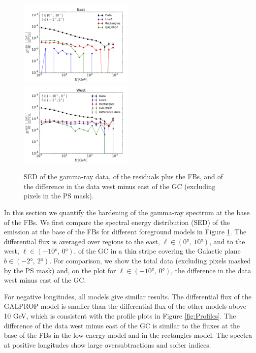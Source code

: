 \begin{figure}[h]
\includegraphics[width=0.5\textwidth]{plots/SED_all_models_source_l=5_b=0.pdf}
\includegraphics[width=0.5\textwidth]{plots/SED_all_models_source_l=-5_b=0.pdf}
  	\caption{SED of the gamma-ray data, of the residuals plus the FBs, and of the difference in the data west minus east of the GC (excluding pixels in the PS mask). 
	}
  	\label{fig:SED_all}
\end{figure}

In this section we quantify the hardening of the gamma-ray spectrum at the base of the FBs. 
We first compare the spectral energy distribution (SED) of the emission at the base of the FBs for different foreground models in Figure \ref{fig:SED_all}. 
The differential flux is averaged over regions to the east, $\ell \in (\ang{0},\ \ang{10})$, and to the west, $\ell \in (\ang{-10},\ \ang{0})$, of the GC
in a thin stripe covering the Galactic plane $b \in (\ang{-2},\ \ang{2})$. 
For comparison, we show the total data (excluding pixels masked by the PS mask) and, on the plot for $\ell \in (\ang{-10},\ \ang{0})$, the difference in the data west minus east
of the GC.

For negative longitudes, all models give similar results. 
The differential flux of the GALPROP model is smaller than the differential flux of the other models above 10 GeV, 
which is consistent with the profile plots in Figure \ref{fig:Profiles}.
The difference of the data west minus east of the GC is similar to the fluxes at the base of the FBs in the low-energy model and in the rectangles model. 
The spectra at positive longitudes show large oversubtractions and softer indices. 

